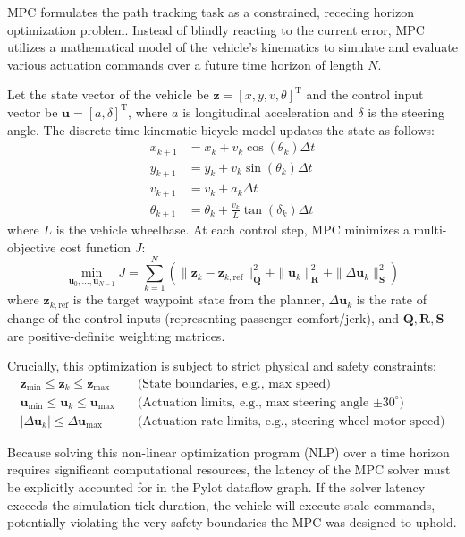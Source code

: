 \documentclass[11pt,a4paper]{report}
\begin{document}
MPC formulates the path tracking task as a constrained, receding horizon optimization problem. Instead of blindly reacting to the current error, MPC utilizes a mathematical model of the vehicle's kinematics to simulate and evaluate various actuation commands over a future time horizon of length $N$. 

Let the state vector of the vehicle be $\mathbf{z} = [x, y, v, \theta]^{\text{T}}$ and the control input vector be $\mathbf{u} = [a, \delta]^{\text{T}}$, where $a$ is longitudinal acceleration and $\delta$ is the steering angle. The discrete-time kinematic bicycle model updates the state as follows:
\begin{align}
    x_{k+1} &= x_k + v_k \cos(\theta_k) \Delta t \\
    y_{k+1} &= y_k + v_k \sin(\theta_k) \Delta t \\
    v_{k+1} &= v_k + a_k \Delta t \\
    \theta_{k+1} &= \theta_k + \frac{v_k}{L} \tan(\delta_k) \Delta t
\end{align}
where $L$ is the vehicle wheelbase. At each control step, MPC minimizes a multi-objective cost function $J$:
\begin{equation}
    \min_{\mathbf{u}_0, \dots, \mathbf{u}_{N-1}} J = \sum_{k=1}^{N} \left( \|\mathbf{z}_k - \mathbf{z}_{k,\text{ref}}\|_{\mathbf{Q}}^2 + \|\mathbf{u}_k\|_{\mathbf{R}}^2 + \|\Delta \mathbf{u}_k\|_{\mathbf{S}}^2 \right)
\end{equation}
where $\mathbf{z}_{k,\text{ref}}$ is the target waypoint state from the planner, $\Delta \mathbf{u}_k$ is the rate of change of the control inputs (representing passenger comfort/jerk), and $\mathbf{Q}, \mathbf{R}, \mathbf{S}$ are positive-definite weighting matrices. 

Crucially, this optimization is subject to strict physical and safety constraints:
\begin{align}
    \mathbf{z}_{\text{min}} \le \mathbf{z}_k \le \mathbf{z}_{\text{max}} \quad &\text{(State boundaries, e.g., max speed)} \\
    \mathbf{u}_{\text{min}} \le \mathbf{u}_k \le \mathbf{u}_{\text{max}} \quad &\text{(Actuation limits, e.g., max steering angle $\pm 30^{\circ}$)} \\
    |\Delta \mathbf{u}_k| \le \Delta \mathbf{u}_{\text{max}} \quad &\text{(Actuation rate limits, e.g., steering wheel motor speed)}
\end{align}

Because solving this non-linear optimization program (NLP) over a time horizon requires significant computational resources, the latency of the MPC solver must be explicitly accounted for in the Pylot dataflow graph. If the solver latency exceeds the simulation tick duration, the vehicle will execute stale commands, potentially violating the very safety boundaries the MPC was designed to uphold.
\end{document}
